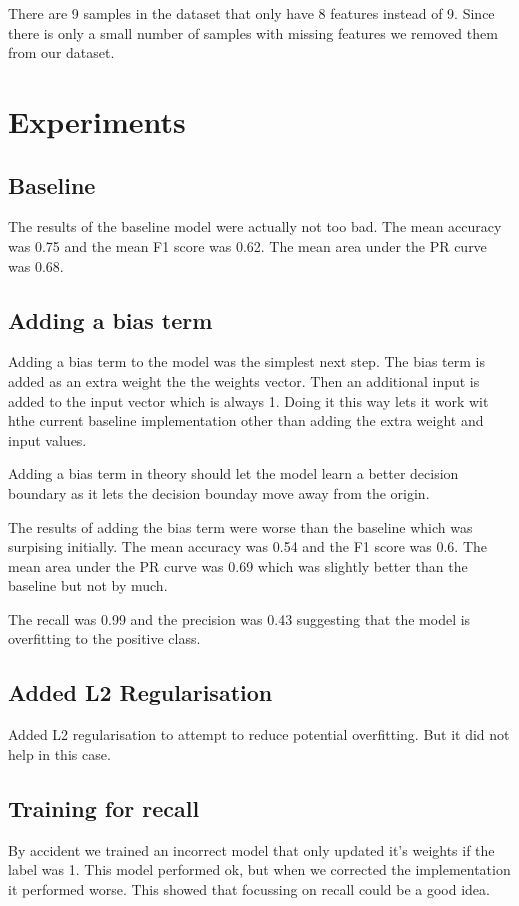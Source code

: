 There are 9 samples in the dataset that only have 8 features instead of 9. Since there is only a small number of samples with missing features we removed them from our dataset.



\section{Experiments}

\subsection{Baseline}

The results of the baseline model were actually not too bad. The mean accuracy was 0.75 and the mean F1 score was 0.62. The mean area under the PR curve was 0.68. 

\subsection{Adding a bias term}

Adding a bias term to the model was the simplest next step. The bias term is added as an extra weight the the weights vector. Then an additional input is added to the input vector which is always 1. Doing it this way lets it work wit hthe current baseline implementation other than adding the extra weight and input values.

Adding a bias term in theory should let the model learn a better decision boundary as it lets the decision bounday move away from the origin.

The results of adding the bias term were worse than the baseline which was surpising initially. The mean accuracy was 0.54 and the F1 score was 0.6. The mean area under the PR curve was 0.69 which was slightly better than the baseline but not by much.

The recall was 0.99 and the precision was 0.43 suggesting that the model is overfitting to the positive class.

\subsection{Added L2 Regularisation}

Added L2 regularisation to attempt to reduce potential overfitting. But it did not help in this case. 


\subsection{Training for recall}

By accident we trained an incorrect model that only updated it's weights if the label was 1. This model performed ok, but when we corrected the implementation it performed worse. This showed that focussing on recall could be a good idea.
